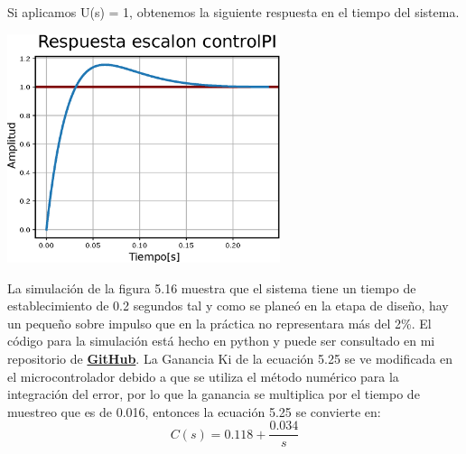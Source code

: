 Si aplicamos U(s) = 1, obtenemos la siguiente respuesta en el tiempo del sistema. 
\begin{center}
	\includegraphics[width=0.6\textwidth]{Contenido/Cuerpo/Capitulo5/Fig38.eps}
	\label{Fig4}
\end{center}
La simulación de la figura 5.16 muestra que el sistema tiene un tiempo de establecimiento de 0.2 segundos tal y como se
planeó en la etapa de diseño, hay un pequeño sobre impulso que en la práctica no representara más del 2\%. El código para
la simulación está hecho en python y puede ser consultado en mi repositorio de \href{https://github.com/MarcoAAG/Tesis}{\textbf{GitHub}}.
La Ganancia Ki de la ecuación 5.25 se ve modificada en el microcontrolador debido a que se utiliza el método numérico para la integración del error, por lo que
la ganancia se multiplica por el tiempo de muestreo que es de 0.016, entonces la ecuación 5.25 se convierte en:
\begin{equation}
	C(s) = 0.118 + \frac{0.034}{s}
\end{equation}
